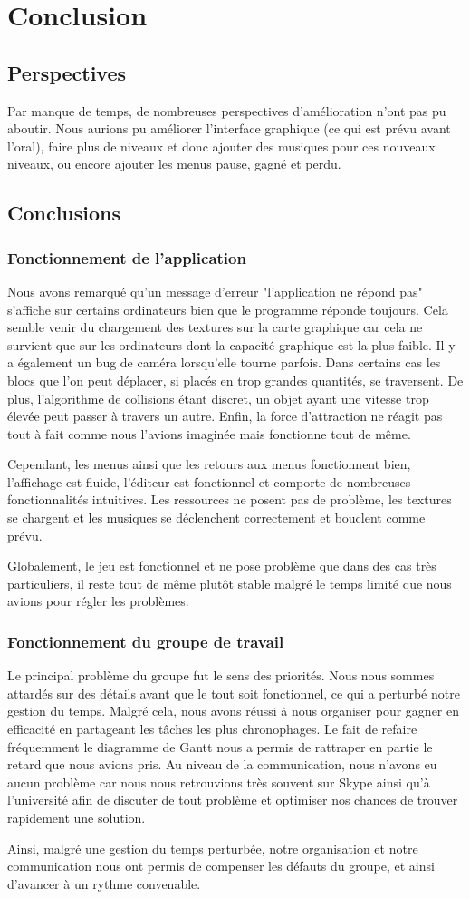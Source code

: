 \chapter{Conclusion}
	\section{Perspectives}
		Par manque de temps, de nombreuses perspectives d'amélioration n'ont pas pu aboutir. Nous aurions pu améliorer l'interface graphique (ce qui est prévu avant l'oral), faire plus de niveaux et donc ajouter des musiques pour ces nouveaux niveaux, ou encore ajouter les menus pause, gagné et perdu. 
	\section{Conclusions}
		\subsection{Fonctionnement de l'application}
			Nous avons remarqué qu'un message d'erreur "l'application ne répond pas" s'affiche sur certains ordinateurs bien que le programme réponde toujours. Cela semble venir du chargement des textures sur la carte graphique car cela ne survient que sur les ordinateurs dont la capacité graphique est la plus faible. Il y a également un bug de caméra lorsqu'elle tourne parfois. Dans certains cas les blocs que l'on peut déplacer, si placés en trop grandes quantités, se traversent. De plus, l'algorithme de collisions étant discret, un objet ayant une vitesse trop élevée peut passer à travers un autre. Enfin, la force d'attraction ne réagit pas tout à fait comme nous l'avions imaginée mais fonctionne tout de même.
			
			Cependant, les menus ainsi que les retours aux menus fonctionnent bien, l'affichage est fluide, l'éditeur est fonctionnel et comporte de nombreuses fonctionnalités intuitives. Les ressources ne posent pas de problème, les textures se chargent et les musiques se déclenchent correctement et bouclent comme prévu.  
			
			Globalement, le jeu est fonctionnel et ne pose problème que dans des cas très particuliers, il reste tout de même plutôt stable malgré le temps limité que nous avions pour régler les problèmes.
			
		\subsection{Fonctionnement du groupe de travail}
			Le principal problème du groupe fut le sens des priorités. Nous nous sommes attardés sur des détails avant que le tout soit fonctionnel, ce qui a perturbé notre gestion du temps. Malgré cela, nous avons réussi à nous organiser pour gagner en efficacité en partageant les tâches les plus chronophages. Le fait de refaire fréquemment le diagramme de Gantt nous a permis de rattraper en partie le retard que nous avions pris. Au niveau de la communication, nous n'avons eu aucun problème car nous nous retrouvions très souvent sur Skype ainsi qu'à l'université afin de discuter de tout problème et optimiser nos chances de trouver rapidement une solution. 
			
			Ainsi, malgré une gestion du temps perturbée, notre organisation et notre communication nous ont permis de compenser les défauts du groupe, et ainsi d'avancer à un rythme convenable. 